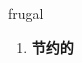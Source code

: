 
\begin{frame}
{\huge frugal}
\begin{center}
\begin{enumerate}\Large
  \item \textbf{节约的}
\end{enumerate}
\end{center}
\end{frame}
